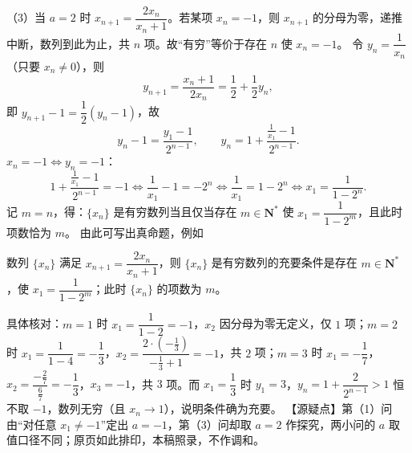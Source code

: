 \begin{answer}
（3）当 $a=2$ 时 $x_{n+1}=\dfrac{2x_n}{x_n+1}$。若某项 $x_n=-1$，则 $x_{n+1}$ 的分母为零，递推中断，数列到此为止，共 $n$ 项。故“有穷”等价于存在 $n$ 使 $x_n=-1$。
令 $y_n=\dfrac1{x_n}$（只要 $x_n\neq0$），则
\nopagebreak[4]
\[y_{n+1}=\frac{x_n+1}{2x_n}=\frac12+\frac12y_n,\]
即 $y_{n+1}-1=\dfrac12\left(y_n-1\right)$，故
\nopagebreak[4]
\[y_n-1=\frac{y_1-1}{2^{n-1}},\qquad y_n=1+\frac{\frac1{x_1}-1}{2^{n-1}}.\]
$x_n=-1\iff y_n=-1$：
\nopagebreak[4]
\[1+\frac{\frac1{x_1}-1}{2^{n-1}}=-1\iff\frac1{x_1}-1=-2^n\iff\frac1{x_1}=1-2^n\iff x_1=\frac1{1-2^n}.\]
记 $m=n$，得：$\{x_n\}$ 是有穷数列当且仅当存在 $m\in\mathbf N^*$ 使 $x_1=\dfrac1{1-2^m}$，且此时项数恰为 $m$。
由此可写出真命题，例如
\begin{gktip}
数列 $\{x_n\}$ 满足 $x_{n+1}=\dfrac{2x_n}{x_n+1}$，则 $\{x_n\}$ 是有穷数列的充要条件是存在 $m\in\mathbf N^*$，使 $x_1=\dfrac1{1-2^m}$；此时 $\{x_n\}$ 的项数为 $m$。
\end{gktip}

具体核对：$m=1$ 时 $x_1=\dfrac1{1-2}=-1$，$x_2$ 因分母为零无定义，仅 $1$ 项；$m=2$ 时 $x_1=\dfrac1{1-4}=-\dfrac13$，$x_2=\dfrac{2\cdot\left(-\frac13\right)}{-\frac13+1}=-1$，共 $2$ 项；$m=3$ 时 $x_1=-\dfrac17$，$x_2=\dfrac{-\frac27}{\frac67}=-\dfrac13$，$x_3=-1$，共 $3$ 项。而 $x_1=\dfrac13$ 时 $y_1=3$，$y_n=1+\dfrac{2}{2^{n-1}}>1$ 恒不取 $-1$，数列无穷（且 $x_n\to1$），说明条件确为充要。
【源疑点】第（1）问由“对任意 $x_1\neq-1$”定出 $a=-1$，第（3）问却取 $a=2$ 作探究，两小问的 $a$ 取值口径不同；原页如此排印，本稿照录，不作调和。


\end{answer}